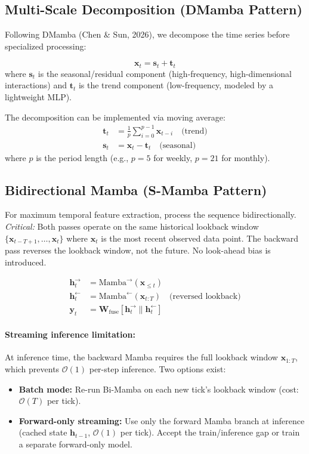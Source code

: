 \documentclass[11pt,a4paper]{article}
\begin{document}
\subsection{Multi-Scale Decomposition (DMamba Pattern)}

Following DMamba (Chen \& Sun, 2026), we decompose the time series before
specialized processing:

\[
\mathbf{x}_t = \mathbf{s}_t + \mathbf{t}_t
\]
where $\mathbf{s}_t$ is the seasonal/residual component (high-frequency,
high-dimensional interactions) and $\mathbf{t}_t$ is the trend component
(low-frequency, modeled by a lightweight MLP).

The decomposition can be implemented via moving average:
\begin{align}
  \mathbf{t}_t &= \frac{1}{p} \sum_{i=0}^{p-1} \mathbf{x}_{t-i} \quad \text{(trend)} \\
  \mathbf{s}_t &= \mathbf{x}_t - \mathbf{t}_t \quad \text{(seasonal)}
\end{align}
where $p$ is the period length (e.g., $p=5$ for weekly, $p=21$ for monthly).

\subsection{Bidirectional Mamba (S-Mamba Pattern)}

For maximum temporal feature extraction, process the sequence bidirectionally.
\emph{Critical:} Both passes operate on the same historical lookback window
$\{\mathbf{x}_{t-T+1}, \ldots, \mathbf{x}_t\}$ where $\mathbf{x}_t$ is the most
recent observed data point. The backward pass reverses the lookback window, not
the future. No look-ahead bias is introduced.

\begin{align}
  \mathbf{h}_t^{\rightarrow} &= \text{Mamba}^{\rightarrow}(\mathbf{x}_{\leq t}) \\
  \mathbf{h}_t^{\leftarrow} &= \text{Mamba}^{\leftarrow}(\mathbf{x}_{t:T}) \quad\text{(reversed lookback)} \\
  \mathbf{y}_t &= \mathbf{W}_{\text{fuse}} \left[\mathbf{h}_t^{\rightarrow} \parallel \mathbf{h}_t^{\leftarrow}\right]
\end{align}

\paragraph{Streaming inference limitation:} At inference time, the backward
Mamba requires the full lookback window $\mathbf{x}_{1:T}$, which prevents
$\mathcal{O}(1)$ per-step inference. Two options exist:
\begin{itemize}
  \item \textbf{Batch mode:} Re-run Bi-Mamba on each new tick's lookback window
    (cost: $\mathcal{O}(T)$ per tick).
  \item \textbf{Forward-only streaming:} Use only the forward Mamba branch at
    inference (cached state $\mathbf{h}_{t-1}$, $\mathcal{O}(1)$ per tick).
    Accept the train/inference gap or train a separate forward-only model.
\end{itemize}
\end{document}
